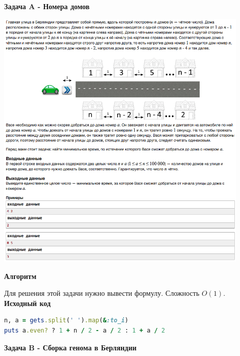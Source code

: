 \documentclass[a4paper,12pt]{article}
\begin{document}
\newpage
\textbf{{\large Задача A - Номера домов}}

\begin{center}
\includegraphics[width=0.9\textwidth]{VK_Q2/A.png}\\ [1cm]
\end{center}

\textbf{{\large Алгоритм}}

Для решения этой задачи нужно вывести формулу. Сложность $O(1)$.\\

\textbf{{\large Исходный код}} \\
\begin{lstlisting}[language=Ruby]
n, a = gets.split(' ').map(&:to_i)
puts a.even? ? 1 + n / 2 - a / 2 : 1 + a / 2
\end{lstlisting}


\newpage
\textbf{{\large Задача B - Сборка генома в Берляндии}}
\end{document}
